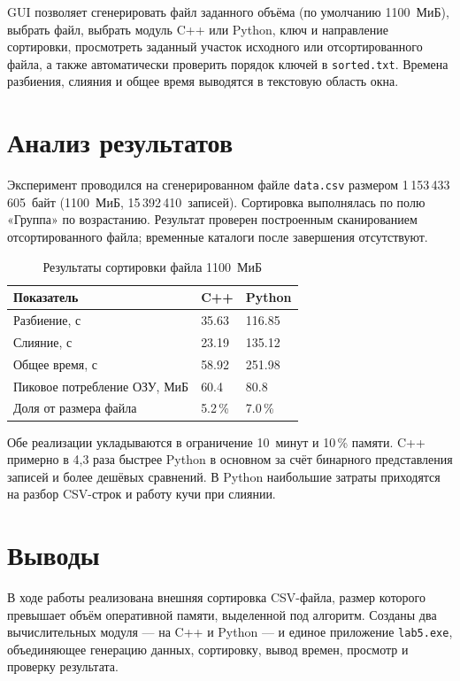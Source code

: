 \documentclass[oneside,a4paper,14pt]{extarticle}
\begin{document}
GUI позволяет сгенерировать файл заданного объёма (по умолчанию 1100~МиБ), выбрать файл, выбрать модуль C++ или Python, ключ и направление сортировки, просмотреть заданный участок исходного или отсортированного файла, а также автоматически проверить порядок ключей в \texttt{sorted.txt}. Времена разбиения, слияния и общее время выводятся в текстовую область окна.

\section*{Анализ результатов}
Эксперимент проводился на сгенерированном файле \texttt{data.csv} размером 1\,153\,433\,605~байт (1100~МиБ, 15\,392\,410~записей). Сортировка выполнялась по полю «Группа» по возрастанию. Результат проверен построенным сканированием отсортированного файла; временные каталоги после завершения отсутствуют.

\begin{table}[H]
	\centering
	\caption{Результаты сортировки файла 1100~МиБ}
	\renewcommand{\arraystretch}{1.2}
	\begin{tabular}{|p{4.0cm}|p{5.5cm}|p{5.5cm}|}
		\hline
		Показатель & C++ & Python \\
		\hline
		Разбиение, с & 35.63 & 116.85 \\
		\hline
		Слияние, с & 23.19 & 135.12 \\
		\hline
		Общее время, с & 58.92 & 251.98 \\
		\hline
		Пиковое потребление ОЗУ, МиБ & 60.4 & 80.8 \\
		\hline
		Доля от размера файла & 5.2\,\% & 7.0\,\% \\
		\hline
	\end{tabular}
\end{table}

Обе реализации укладываются в ограничение 10~минут и 10\,\% памяти. C++ примерно в 4,3 раза быстрее Python в основном за счёт бинарного представления записей и более дешёвых сравнений. В Python наибольшие затраты приходятся на разбор CSV-строк и работу кучи при слиянии.

\section*{Выводы}
В ходе работы реализована внешняя сортировка CSV-файла, размер которого превышает объём оперативной памяти, выделенной под алгоритм. Созданы два вычислительных модуля --- на C++ и Python --- и единое приложение \texttt{lab5.exe}, объединяющее генерацию данных, сортировку, вывод времен, просмотр и проверку результата.
\end{document}
